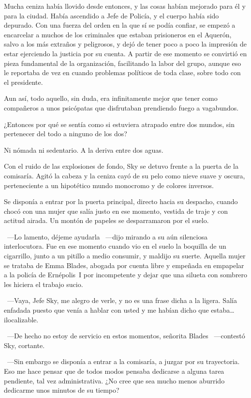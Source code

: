 Mucha ceniza había llovido desde entonces, y las cosas habían mejorado para él y para la ciudad. Había ascendido a Jefe de Policía, y el cuerpo había sido depurado. Con una fuerza del orden en la que sí se podía confiar, se empezó a encarcelar a muchos de los criminales que estaban prisioneros en el Aquerón, salvo a los más extraños y peligrosos, y dejó de tener poco a poco la impresión de estar ejerciendo la justicia por su cuenta. A partir de ese momento se convirtió en pieza fundamental de la organización, facilitando la labor del grupo, aunque eso le reportaba de vez en cuando problemas políticos de toda clase, sobre todo con el presidente.

Aun así, todo aquello, sin duda, era infinitamente mejor que tener como compañeros a unos psicópatas que disfrutaban prendiendo fuego a vagabundos.

¿Entonces por qué se sentía como si estuviera atrapado entre dos mundos, sin pertenecer del todo a ninguno de los dos?

Ni nómada ni sedentario. A la deriva entre dos aguas.

Con el ruido de las explosiones de fondo, Sky se detuvo frente a la puerta de la comisaría. Agitó la cabeza y la ceniza cayó de su pelo como nieve suave y oscura, perteneciente a un hipotético mundo monocromo y de colores inversos.

Se disponía a entrar por la puerta principal, directo hacia su despacho, cuando chocó con una mujer que salía justo en ese momento, vestida de traje y con actitud airada. Un montón de papeles se desparramaron por el suelo.

~---Lo lamento, déjeme ayudarla ~---dijo mirando a su aún silenciosa interlocutora. Fue en ese momento cuando vio en el suelo la boquilla de un cigarrillo, junto a un pitillo a medio consumir, y maldijo su suerte. Aquella mujer se trataba de Emma Blades, abogada por cuenta libre y empeñada en empapelar a la policía de Ernépolis~I por incompetente y dejar que una silueta con sombrero les hiciera el trabajo sucio.

~---Vaya, Jefe Sky, me alegro de verle, y no es una frase dicha a la ligera. Salía enfadada puesto que venía a hablar con usted y me habían dicho que estaba\dots{} ilocalizable.

~---De hecho no estoy de servicio en estos momentos, señorita Blades ~---contestó Sky, cortante.

~---Sin embargo se disponía a entrar a la comisaría, a juzgar por su trayectoria. Eso me hace pensar que de todos modos pensaba dedicarse a alguna tarea pendiente, tal vez administrativa. ¿No cree que sea mucho menos aburrido dedicarme unos minutos de su tiempo?

